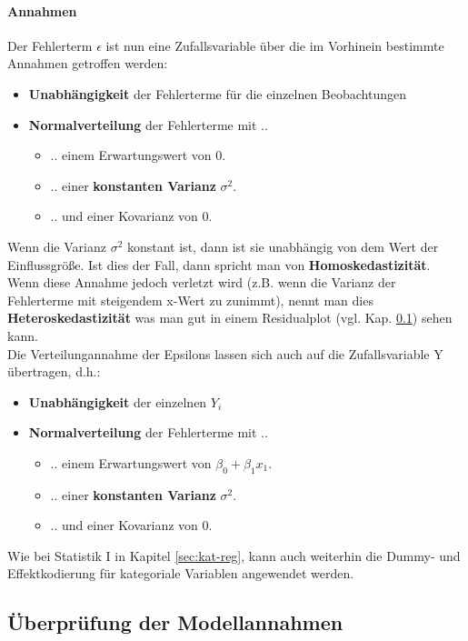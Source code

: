 \documentclass[a4paper]{article}
\begin{document}
\paragraph{Annahmen} Der Fehlerterm $\epsilon$ ist nun eine Zufallsvariable über die im Vorhinein bestimmte Annahmen getroffen werden:
\begin{itemize}
    \item \textbf{Unabhängigkeit} der Fehlerterme für die einzelnen Beobachtungen
    \item \textbf{Normalverteilung} der Fehlerterme mit ..
    \begin{itemize}
        \item .. einem Erwartungswert von 0.
        \item .. einer \textbf{konstanten Varianz} $\sigma^2$.
        \item .. und einer Kovarianz von 0.
    \end{itemize}
\end{itemize}
Wenn die Varianz $\sigma^2$ konstant ist, dann ist sie unabhängig von dem Wert der Einflussgröße. Ist dies der Fall, dann spricht man von \textbf{Homoskedastizität}. Wenn diese Annahme jedoch verletzt wird (z.B. wenn die Varianz der Fehlerterme mit steigendem x-Wert zu zunimmt), nennt man dies \textbf{Heteroskedastizität} was man gut in einem Residualplot (vgl. Kap. \ref{sec:reg-fig}) sehen kann.\\
Die Verteilungannahme der Epsilons lassen sich auch auf die Zufallsvariable Y übertragen, d.h.:
\begin{itemize}
    \item \textbf{Unabhängigkeit} der einzelnen $Y_i$ 
    \item \textbf{Normalverteilung} der Fehlerterme mit ..
    \begin{itemize}
        \item .. einem Erwartungswert von $\beta_0+\beta_1x_1$.
        \item .. einer \textbf{konstanten Varianz} $\sigma^2$.
        \item .. und einer Kovarianz von 0.
    \end{itemize}
\end{itemize}

\noindent Wie bei Statistik I in Kapitel \ref{sec:kat-reg}, kann auch weiterhin die Dummy- und Effektkodierung für kategoriale Variablen angewendet werden.

\subsection{Überprüfung der Modellannahmen}\label{sec:reg-fig}
\end{document}
